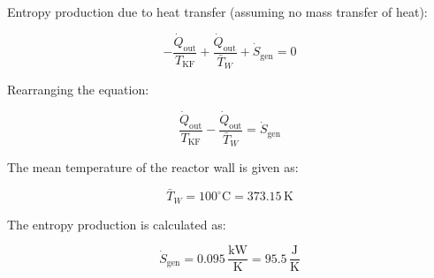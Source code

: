 Entropy production due to heat transfer (assuming no mass transfer of heat):  

\[
-\frac{\dot{Q}_{\text{out}}}{T_{\text{KF}}} + \frac{\dot{Q}_{\text{out}}}{\bar{T}_W} + \dot{S}_{\text{gen}} = 0
\]

Rearranging the equation:  

\[
\frac{\dot{Q}_{\text{out}}}{T_{\text{KF}}} - \frac{\dot{Q}_{\text{out}}}{\bar{T}_W} = \dot{S}_{\text{gen}}
\]

The mean temperature of the reactor wall is given as:  

\[
\bar{T}_W = 100^\circ\text{C} = 373.15 \, \text{K}
\]

The entropy production is calculated as:  

\[
\dot{S}_{\text{gen}} = 0.095 \, \frac{\text{kW}}{\text{K}} = 95.5 \, \frac{\text{J}}{\text{K}}
\]